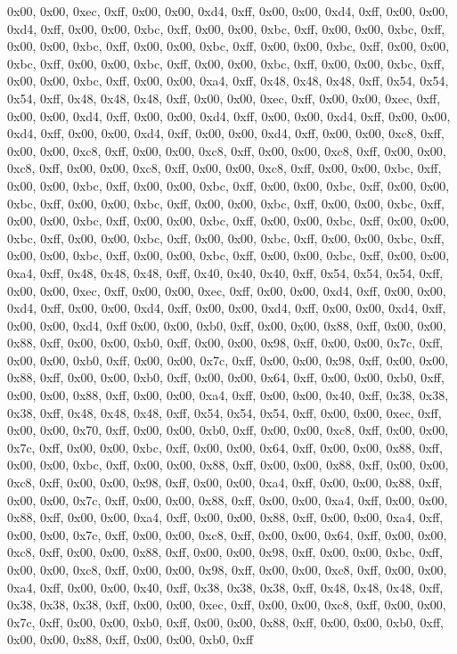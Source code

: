 0x00, 0x00, 0xec, 0xff, 0x00, 0x00, 0xd4, 0xff, 0x00, 0x00, 0xd4, 0xff, 0x00, 0x00, 0xd4, 0xff, 0x00, 0x00, 0xbc, 0xff, 0x00, 0x00, 0xbc, 0xff, 0x00, 0x00, 0xbc, 0xff, 0x00, 0x00, 0xbc, 0xff, 0x00, 0x00, 0xbc, 0xff, 0x00, 0x00, 0xbc, 0xff, 0x00, 0x00, 0xbc, 0xff, 0x00, 0x00, 0xbc, 0xff, 0x00, 0x00, 0xbc, 0xff, 0x00, 0x00, 0xbc, 0xff, 0x00, 0x00, 0xbc, 0xff, 0x00, 0x00, 0xa4, 0xff, 0x48, 0x48, 0x48, 0xff, 0x54, 0x54, 0x54, 0xff, 0x48, 0x48, 0x48, 0xff, 0x00, 0x00, 0xec, 0xff, 0x00, 0x00, 0xec, 0xff, 0x00, 0x00, 0xd4, 0xff, 0x00, 0x00, 0xd4, 0xff, 0x00, 0x00, 0xd4, 0xff, 0x00, 0x00, 0xd4, 0xff, 0x00, 0x00, 0xd4, 0xff, 0x00, 0x00, 0xd4, 0xff, 0x00, 0x00, 0xc8, 0xff, 0x00, 0x00, 0xc8, 0xff, 0x00, 0x00, 0xc8, 0xff, 0x00, 0x00, 0xc8, 0xff, 0x00, 0x00, 0xc8, 0xff, 0x00, 0x00, 0xc8, 0xff, 0x00, 0x00, 0xc8, 0xff, 0x00, 0x00, 0xbc, 0xff, 0x00, 0x00, 0xbc, 0xff, 0x00, 0x00, 0xbc, 0xff, 0x00, 0x00, 0xbc, 0xff, 0x00, 0x00, 0xbc, 0xff, 0x00, 0x00, 0xbc, 0xff, 0x00, 0x00, 0xbc, 0xff, 0x00, 0x00, 0xbc, 0xff, 0x00, 0x00, 0xbc, 0xff, 0x00, 0x00, 0xbc, 0xff, 0x00, 0x00, 0xbc, 0xff, 0x00, 0x00, 0xbc, 0xff, 0x00, 0x00, 0xbc, 0xff, 0x00, 0x00, 0xbc, 0xff, 0x00, 0x00, 0xbc, 0xff, 0x00, 0x00, 0xbc, 0xff, 0x00, 0x00, 0xbc, 0xff, 0x00, 0x00, 0xbc, 0xff, 0x00, 0x00, 0xa4, 0xff, 0x48, 0x48, 0x48, 0xff, 0x40, 0x40, 0x40, 0xff, 0x54, 0x54, 0x54, 0xff, 0x00, 0x00, 0xec, 0xff, 0x00, 0x00, 0xec, 0xff, 0x00, 0x00, 0xd4, 0xff, 0x00, 0x00, 0xd4, 0xff, 0x00, 0x00, 0xd4, 0xff, 0x00, 0x00, 0xd4, 0xff, 0x00, 0x00, 0xd4, 0xff, 0x00, 0x00, 0xd4, 0xff
0x00, 0x00, 0xb0, 0xff, 0x00, 0x00, 0x88, 0xff, 0x00, 0x00, 0x88, 0xff, 0x00, 0x00, 0xb0, 0xff, 0x00, 0x00, 0x98, 0xff, 0x00, 0x00, 0x7c, 0xff, 0x00, 0x00, 0xb0, 0xff, 0x00, 0x00, 0x7c, 0xff, 0x00, 0x00, 0x98, 0xff, 0x00, 0x00, 0x88, 0xff, 0x00, 0x00, 0xb0, 0xff, 0x00, 0x00, 0x64, 0xff, 0x00, 0x00, 0xb0, 0xff, 0x00, 0x00, 0x88, 0xff, 0x00, 0x00, 0xa4, 0xff, 0x00, 0x00, 0x40, 0xff, 0x38, 0x38, 0x38, 0xff, 0x48, 0x48, 0x48, 0xff, 0x54, 0x54, 0x54, 0xff, 0x00, 0x00, 0xec, 0xff, 0x00, 0x00, 0x70, 0xff, 0x00, 0x00, 0xb0, 0xff, 0x00, 0x00, 0xc8, 0xff, 0x00, 0x00, 0x7c, 0xff, 0x00, 0x00, 0xbc, 0xff, 0x00, 0x00, 0x64, 0xff, 0x00, 0x00, 0x88, 0xff, 0x00, 0x00, 0xbc, 0xff, 0x00, 0x00, 0x88, 0xff, 0x00, 0x00, 0x88, 0xff, 0x00, 0x00, 0xc8, 0xff, 0x00, 0x00, 0x98, 0xff, 0x00, 0x00, 0xa4, 0xff, 0x00, 0x00, 0x88, 0xff, 0x00, 0x00, 0x7c, 0xff, 0x00, 0x00, 0x88, 0xff, 0x00, 0x00, 0xa4, 0xff, 0x00, 0x00, 0x88, 0xff, 0x00, 0x00, 0xa4, 0xff, 0x00, 0x00, 0x88, 0xff, 0x00, 0x00, 0xa4, 0xff, 0x00, 0x00, 0x7c, 0xff, 0x00, 0x00, 0xc8, 0xff, 0x00, 0x00, 0x64, 0xff, 0x00, 0x00, 0xc8, 0xff, 0x00, 0x00, 0x88, 0xff, 0x00, 0x00, 0x98, 0xff, 0x00, 0x00, 0xbc, 0xff, 0x00, 0x00, 0xc8, 0xff, 0x00, 0x00, 0x98, 0xff, 0x00, 0x00, 0xc8, 0xff, 0x00, 0x00, 0xa4, 0xff, 0x00, 0x00, 0x40, 0xff, 0x38, 0x38, 0x38, 0xff, 0x48, 0x48, 0x48, 0xff, 0x38, 0x38, 0x38, 0xff, 0x00, 0x00, 0xec, 0xff, 0x00, 0x00, 0xc8, 0xff, 0x00, 0x00, 0x7c, 0xff, 0x00, 0x00, 0xb0, 0xff, 0x00, 0x00, 0x88, 0xff, 0x00, 0x00, 0xb0, 0xff, 0x00, 0x00, 0x88, 0xff, 0x00, 0x00, 0xb0, 0xff
